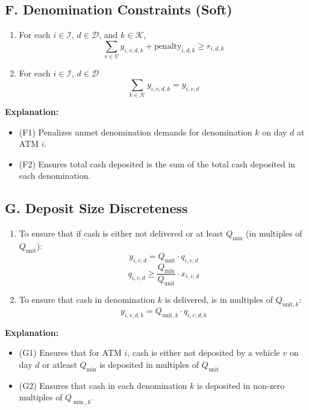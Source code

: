 \documentclass[11pt]{article}
\begin{document}
\subsection*{F. Denomination Constraints (Soft)}
\begin{enumerate}[label=\textbf{(F\arabic*)}]
    \item For each \(i \in \mathcal{I}\), \(d \in \mathcal{D}\), and \(k \in \mathcal{K}\),
    \[
    \sum_{v \in \mathcal{V}} y_{i,v,d,k} + \text{penalty}_{i,d,k} \ge r_{i,d,k} 
    \]
    \item For each \(i \in \mathcal{I}\), \(d \in \mathcal{D}\)
    \[
    \sum_{k \in \mathcal{K}}y_{i,v,d,k} = y_{i,v,d}
    \]
\end{enumerate}
\noindent \textbf{Explanation:}
\begin{itemize}[leftmargin=1cm]
    \item (F1) Penalizes unmet denomination demands for denomination \(k\) on day \(d\) at ATM \(i\).
    \item (F2) Ensures total cash deposited is the sum of the total cash deposited in each denomination.
\end{itemize}

\subsection*{G. Deposit Size Discreteness}
\begin{enumerate}[label=\textbf{(G\arabic*)}]
    \item To ensure that if cash is either not delivered or at least \(Q_{\min}\) (in multiples of \(Q_{\text{unit}}\)):
    \[
        y_{i,v,d} = Q_{\text{unit}} \cdot q_{i,v,d}
    \]
    \[
        q_{i,v,d} \ge \frac{Q_{\min}}{Q_{\text{unit}}}\cdot x_{i,v,d}
    \]
    \item To ensure that cash in denomination \(k\) is delivered, is in multiples of \(Q_{\text{unit},k}\):
    \[
        y_{i,v,d,k} = Q_{\text{unit},k} \cdot q_{i,v,d,k}
    \]
\end{enumerate}

\noindent \textbf{Explanation:}
\begin{itemize}[leftmargin=1cm]
    \item (G1) Ensures that for ATM \(i\), cash is either not deposited by a vehicle \(v\) on day \(d\) or atleast \(Q_{\min}\) is deposited in multiples of \(Q_{\text{unit}}\)
    \item (G2) Ensures that cash in each denomination \(k\) is deposited in non-zero multiples of \(Q_{\min,k}\).
\end{itemize}
\end{document}

